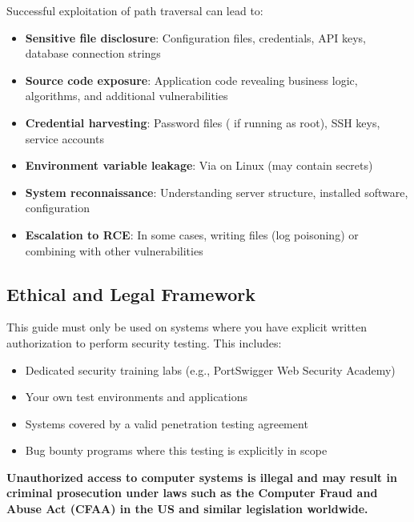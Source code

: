 \documentclass[11pt,letterpaper]{article}
\newcommand{\inlinecode}[1]{\texttt{\detokenize{#1}}}
\begin{document}
Successful exploitation of path traversal can lead to:

\begin{itemize}
  \item \textbf{Sensitive file disclosure}: Configuration files, credentials, API keys, database connection strings
  \item \textbf{Source code exposure}: Application code revealing business logic, algorithms, and additional vulnerabilities
  \item \textbf{Credential harvesting}: Password files (\inlinecode{/etc/shadow} if running as root), SSH keys, service accounts
  \item \textbf{Environment variable leakage}: Via \inlinecode{/proc/self/environ} on Linux (may contain secrets)
  \item \textbf{System reconnaissance}: Understanding server structure, installed software, configuration
  \item \textbf{Escalation to RCE}: In some cases, writing files (log poisoning) or combining with other vulnerabilities
\end{itemize}

\subsection{Ethical and Legal Framework}

\begin{warningbox}
This guide must only be used on systems where you have explicit written authorization to perform security testing. This includes:
\begin{itemize}
  \item Dedicated security training labs (e.g., PortSwigger Web Security Academy)
  \item Your own test environments and applications
  \item Systems covered by a valid penetration testing agreement
  \item Bug bounty programs where this testing is explicitly in scope
\end{itemize}

\textbf{Unauthorized access to computer systems is illegal and may result in criminal prosecution under laws such as the Computer Fraud and Abuse Act (CFAA) in the US and similar legislation worldwide.}
\end{warningbox}

\end{document}
